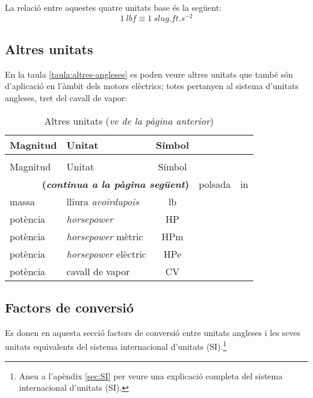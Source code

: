 La relació entre aquestes quatre unitats base és la següent:
\begin{equation}
    \qty{1}{lbf} \equiv \qty{1}{slug.ft.s^{-2}}
\end{equation}

\subsection{Altres unitats}

En la taula \vref{taula:altres-angleses} es poden veure altres unitats que també són d'aplicació en l'àmbit dels motors elèctrics; totes pertanyen al sistema d'unitats angleses, tret del cavall de vapor:
\begin{longtable}[h]{llc}
   \caption{\label{taula:altres-angleses}Altres unitats}\\
   \toprule[1pt]
    Magnitud & Unitat & Símbol \\
   \midrule
   \endfirsthead
   \caption[]{Altres unitats (\emph{ve de la pàgina anterior})}\\
   \toprule[1pt]
    Magnitud & Unitat & Símbol \\
   \midrule
   \endhead
   \midrule
   \multicolumn{3}{r}{\sffamily\bfseries\color{NavyBlue}(\emph{continua a la pàgina següent})}
   \endfoot
   \endlastfoot
   longitud & polsada & in \\
   massa & lliura \textit{avoirdupois} & lb \\
   potència & \textit{horsepower} & HP \\
   potència & \textit{horsepower} mètric & \unit{HPm} \\
   potència & \textit{horsepower} elèctric & \unit{HPe} \\
   potència & cavall de vapor & CV \\
   \bottomrule[1pt]
\end{longtable}
 


\subsection{Factors de conversió}

Es donen en aquesta secció factors de conversió entre unitats angleses i les seves unitats equivalents del sistema internacional d'unitats (SI).\footnote{Aneu a l'apèndix \ref{sec:SI} per veure una explicació completa del sistema internacional d'unitats (SI).}

